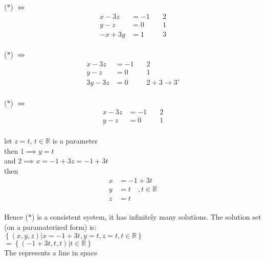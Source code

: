 \documentclass{jhwhw}
\begin{document}
(\(\ast\)) \(\Leftrightarrow\) \begin{align*} 
    x-3z&=-1 \quad &\boxed{2}\\
    y-z&=0 \quad &\boxed{1}\\
    -x+3y&=1 \quad &\boxed{3}
\end{align*}
\\

(\(\ast\)) \(\Leftrightarrow\) \begin{align*} 
    x-3z&=-1 \quad &\boxed{2}\\
    y-z&=0 \quad &\boxed{1}\\
    3y-3z&=0 \quad &\boxed{2} + \boxed{3} \rightarrow \boxed{3}'
\end{align*}
\\

(\(\ast\)) \(\Leftrightarrow\) \begin{align*} 
    x-3z&=-1 \quad &\boxed{2}\\
    y-z&=0 \quad &\boxed{1}\\
\end{align*}

let \(z=t\), \(t \in \mathbb{R}\) is a parameter\\
then \(\boxed{1} \implies y = t\)\\
and \(\boxed{2} \implies x=-1+3z = -1 +3t\)\\
then \begin{align*} 
x&=-1+3t\\
y&=t \quad , t \in \mathbb{R}\\
z&=t
\end{align*}
\\

Hence (\(\ast\)) is a consistent system, it has infinitely many solutions. The solution set (on a paramaterized form) is:
\\

\(\left\{(x,y,z) | x=-1+3t,y=t,z=t,t \in \mathbb{R} \right\}\)\\
\(= \left\{(-1+3t,t,t) | t \in \mathbb{R} \right\}\)\\
The represents a line in space
\end{document}
